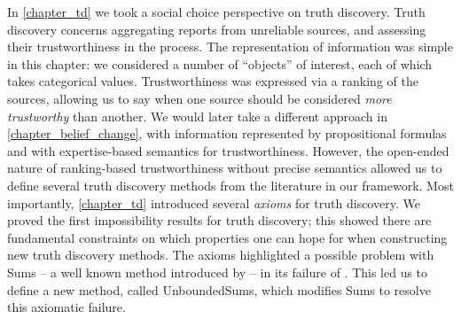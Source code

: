 {
    

In \cref{chapter_td} we took a social choice perspective on truth discovery.
Truth discovery concerns aggregating reports from unreliable sources, and
assessing their trustworthiness in the process. The representation of
information was simple in this chapter: we considered a number of ``objects''
of interest, each of which takes categorical values.  Trustworthiness was
expressed via a ranking of the sources, allowing us to say when one source
should be considered \emph{more trustworthy} than another. We would later take
a different approach in \cref{chapter_belief_change}, with information
represented by propositional formulas and with expertise-based semantics for
trustworthiness. However, the open-ended nature of ranking-based
trustworthiness without precise semantics allowed us to define several truth
discovery methods from the literature in our framework. Most importantly,
\cref{chapter_td} introduced several \emph{axioms} for truth discovery. We
proved the first impossibility results for truth discovery; this showed there
are fundamental constraints on which properties one can hope for when
constructing new truth discovery methods. The axioms highlighted a possible
problem with Sums -- a well known method introduced by
\textcite{pasternack2010} -- in its failure of \disjointindependence{}. This
led us to define a new method, called UnboundedSums, which modifies Sums to
resolve this axiomatic failure.

}


